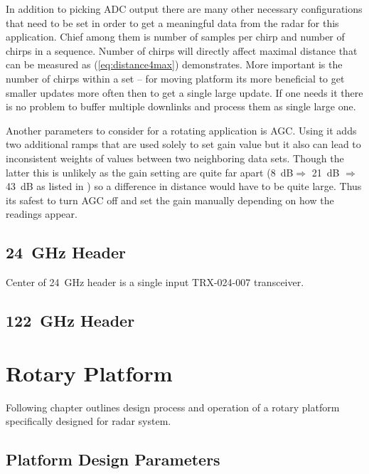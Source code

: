 In addition to picking ADC output there are many other necessary configurations that need to be set in order to get a meaningful data from the radar for this application.
Chief among them is number of samples per chirp and number of chirps in a sequence.
Number of chirps will directly affect maximal distance that can be measured as (\ref{eq:distance4max}) demonstrates.
More important is the number of chirps within a set -- for moving platform its more beneficial to get smaller updates more often then to get a single large update.
If one needs it there is no problem to buffer multiple downlinks and process them as single large one.

Another parameters to consider for a rotating application is AGC.
Using it adds two additional ramps that are used solely to set gain value but it also can lead to inconsistent weights of values between two neighboring data sets.
Though the latter this is unlikely as the gain setting are quite far apart (8~dB$\Rightarrow$ 21~dB $\Rightarrow$ 43~dB as listed in \cite{sidarPRO}) so a difference in distance would have to be quite large.
Thus its safest to turn AGC off and set the gain manually depending on how the readings appear.










\section{24~GHz Header}

Center of 24~GHz header is a single input TRX-024-007 transceiver.



\section{122~GHz Header}



\chapter{Rotary Platform}

Following chapter outlines design process and operation of a rotary platform specifically designed for \sidar radar system.

\section{Platform Design Parameters}


